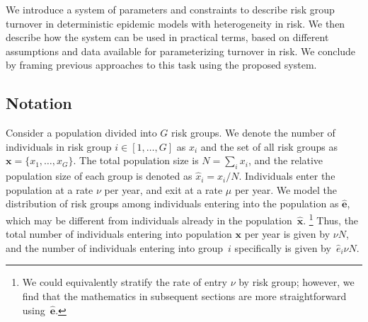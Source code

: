 We introduce a system of parameters and constraints
to describe risk group turnover
in deterministic epidemic models with heterogeneity in risk.
We then describe how the system can be used in practical terms,
based on different assumptions and data available for parameterizing turnover in risk.
We conclude by framing previous approaches to this task using the proposed system.
\subsection{Notation}
\label{aa:notation}
Consider a population divided into $G$ risk groups.
We denote the number of individuals in risk group $i \in [1, \dots, G]$ as $x_i$
and the set of all risk groups as $\bm{x} = \{x_1, \dots, x_G\}$.
The total population size is $N = \sum_i {x_i}$,
and the relative population size of each group
is denoted as $\hat{x}_i = x_i / N$.
Individuals enter the population at a rate $\nu$ per year,
and exit at a rate $\mu$ per year.
We model the distribution of risk groups
among individuals entering into the population as $\bm{\hat{e}}$,
which may be different from individuals already in the population~$\bm{\hat{x}}$.%
\footnote{We could equivalently stratify the rate of entry $\nu$ by risk group;
  however, we find that the mathematics in subsequent sections
  are more straightforward using~$\bm{\hat{e}}$.}
Thus, the total number of individuals
entering into population $\bm{x}$ per year is given by $\nu N$,
and the number of individuals
entering into group~$i$ specifically is given by~$\hat{e}_i \nu N$.
\par
